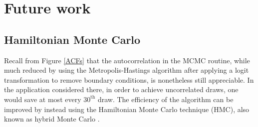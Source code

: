 \documentclass{article}
\begin{document}




\section{Future work}






\subsection{Hamiltonian Monte Carlo}

Recall from Figure \ref{ACFs} that the autocorrelation in the MCMC routine, while much reduced by using the Metropolis-Hastings algorithm after applying a logit transformation to remove boundary conditions, is nonetheless still appreciable. In the application considered there, in order to achieve uncorrelated draws, one would save at most every $30^{\text{th} }$ draw. The efficiency of the algorithm can be improved by instead using the Hamiltonian Monte Carlo technique (HMC), also known as hybrid Monte Carlo \citep{Duane1987}. 
\end{document}
